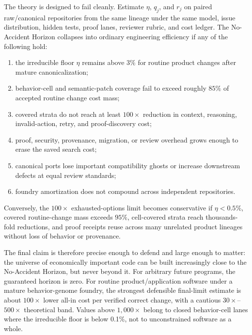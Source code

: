 The theory is designed to fail cleanly. Estimate $\eta$, $q_j$, and $r_j$ on paired raw/canonical repositories from the same lineage under the same model, issue distribution, hidden tests, proof lanes, reviewer rubric, and cost ledger. The No-Accident Horizon collapses into ordinary engineering efficiency if any of the following hold:
\begin{enumerate}
\item the irreducible floor $\eta$ remains above $3\%$ for routine product changes after mature canonicalization;
\item behavior-cell and semantic-patch coverage fail to exceed roughly $85\%$ of accepted routine change cost mass;
\item covered strata do not reach at least $100\times$ reduction in context, reasoning, invalid-action, retry, and proof-discovery cost;
\item proof, security, provenance, migration, or review overhead grows enough to erase the saved search cost;
\item canonical ports lose important compatibility ghosts or increase downstream defects at equal review standards;
\item foundry amortization does not compound across independent repositories.
\end{enumerate}
Conversely, the $100\times$ exhausted-options limit becomes conservative if $\eta<0.5\%$, covered routine-change mass exceeds $95\%$, cell-covered strata reach thousands-fold reductions, and proof receipts reuse across many unrelated product lineages without loss of behavior or provenance.

The final claim is therefore precise enough to defend and large enough to matter: the universe of economically important code can be built increasingly close to the No-Accident Horizon, but never beyond it. For arbitrary future programs, the guaranteed horizon is zero. For routine product/application software under a mature behavior-genome foundry, the strongest defensible final-limit estimate is about $100\times$ lower all-in cost per verified correct change, with a cautious $30\times$--$500\times$ theoretical band. Values above $1{,}000\times$ belong to closed behavior-cell lanes where the irreducible floor is below 0.1\%, not to unconstrained software as a whole.

